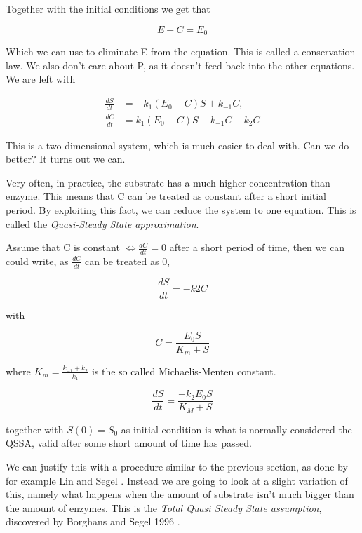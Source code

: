 \documentclass[12pt]{article}
\begin{document}
Together with the initial conditions we get that

\begin{equation}
E + C = E_0
\end{equation}

Which we can use to eliminate E from the equation. This is called a conservation
law.  We also don't care about P, as it doesn't feed back into the other
equations. We are left with

\begin{align}
\frac{dS}{dt} &= -k_1(E_0 - C)S + k_{-1}C, \\
\frac{dC}{dt} &= k_1(E_0 - C)S - k_{-1}C - k_2 C
\end{align}

This is a two-dimensional system, which is much easier to deal with. Can we do
better? It turns out we can.

Very often, in practice, the substrate has a much higher concentration than enzyme. This
means that C can be treated as constant after a short initial period. By
exploiting this fact, we can reduce the system to one equation. This is called
the \textit{Quasi-Steady State approximation}.

Assume that C is constant $\iff \frac{dC}{dt} = 0$ after a short period of time,
then we can could write, as $\frac{dC}{dt}$ can be treated as 0,

\begin{equation}
\frac{dS}{dt} = -k2 C
\end{equation}

with

\begin{equation}
C = \frac{E_0 S}{K_m +S}
\end{equation}

where $K_m = \frac{k_{-1} + k_2}{k_1}$ is the so called {Michaelis-Menten
constant}.

\begin{equation}
\frac{dS}{dt} = \frac{-k_2 E_0 S}{K_M + S}
\end{equation}

together with $S(0) = S_0$ as initial condition is what is normally considered
the QSSA, valid after some short amount of time has passed.

We can justify this with a procedure similar to the previous section, as done by
for example Lin and Segel \cite{lin1974mathematics}. Instead we are going to
look at a slight variation of this, namely what happens when the amount of
substrate isn't much bigger than the amount of enzymes. This is the
\textit{Total Quasi Steady State assumption}, discovered by Borghans and Segel
1996 \cite{borghans1996extending}.
\end{document}
